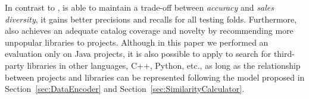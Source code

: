 In contrast to \LR, \CR is able to maintain a trade-off between \emph{accuracy} and \emph{sales diversity}, it gains better precisions and recalls for all testing folds. Furthermore, \CR also achieves an adequate catalog coverage and novelty by recommending more unpopular libraries to projects. Although in this paper we performed an evaluation only on Java projects, it is also possible to apply \CR to search for third-party libraries in other languages, \eg C++, Python, etc., as long as the relationship between projects and libraries can be represented following the model proposed in Section~\ref{sec:DataEncoder} and Section~\ref{sec:SimilarityCalculator}.%






